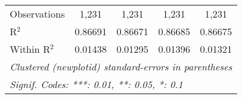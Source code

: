 \begin{table}[htbp]
\begin{tabular}{lcccc}
      Observations                                     & 1,231          & 1,231          & 1,231         & 1,231\\  
      R$^2$                                            & 0.86691        & 0.86671        & 0.86685       & 0.86675\\  
      Within R$^2$                                     & 0.01438        & 0.01295        & 0.01396       & 0.01321\\  
      \midrule \midrule
      \multicolumn{5}{l}{\emph{Clustered (newplotid) standard-errors in parentheses}}\\
      \multicolumn{5}{l}{\emph{Signif. Codes: ***: 0.01, **: 0.05, *: 0.1}}\\
   \end{tabular}
\end{table}


